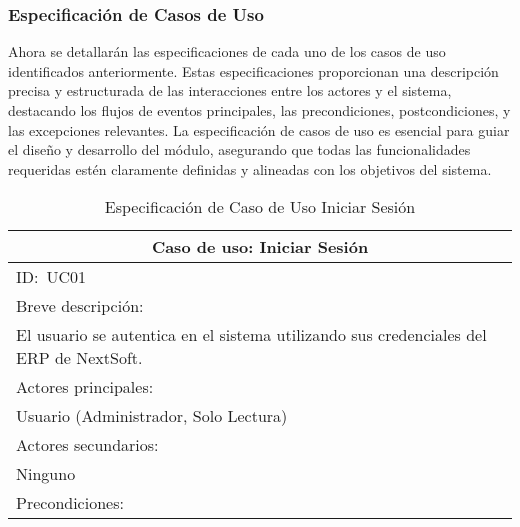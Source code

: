 \documentclass[stu, 12pt, letterpaper, donotrepeattitle, floatsintext, natbib]{apa7}
\begin{document}
\subsubsection{Especificaci\'on de Casos de Uso}
Ahora se detallar\'an las especificaciones de cada uno de los casos de uso identificados anteriormente. Estas especificaciones proporcionan una descripci\'on precisa y estructurada de las interacciones entre los actores y el sistema, destacando los flujos
de eventos principales, las precondiciones, postcondiciones, y las excepciones relevantes. La especificaci\'on de casos de uso es esencial para guiar el diseño y desarrollo del m\'odulo, asegurando que todas las funcionalidades requeridas est\'en claramente
definidas y alineadas con los objetivos del sistema.
\newline
\begin{longtable}{@{} p{16.5cm} @{}}
    \caption{Especificaci\'on de Caso de Uso Iniciar Sesi\'on}\label{tab:UC01}                                                            \\ \toprule
    \multicolumn{1}{c}{Caso de uso: Iniciar Sesi\'on}                                                                                     \\ \midrule
    ID:~UC01                                                                                                                              \\ \midrule
    Breve descripci\'on:                                                                                                                  \\
    El usuario se autentica en el sistema utilizando sus credenciales del ERP de NextSoft.                                                \\ \midrule
    Actores principales:                                                                                                                  \\
    Usuario (Administrador, Solo Lectura)                                                                                                 \\ \midrule
    Actores secundarios:                                                                                                                  \\
    Ninguno                                                                                                                               \\ \midrule
    Precondiciones:                                                                                                                       \\

\end{longtable}
\end{document}
